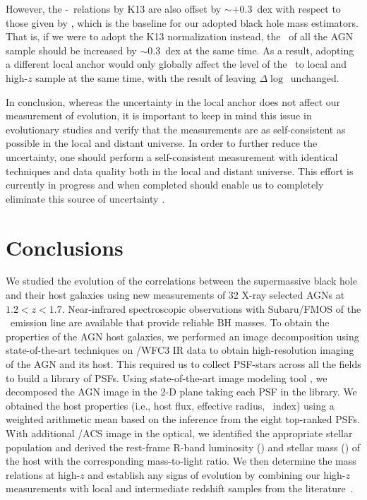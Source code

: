\documentclass[apj]{emulateapj}
\begin{document}
However, the \mbh-\sigstar\ relations by K13 are also offset by  $\sim+0.3$~dex with respect to those given by \citet{Woo2010}, which is the baseline for our adopted black hole mass estimators. That is, if we were to adopt the K13 normalization instead, the \mbh\ of all the AGN sample should be increased by $\sim$0.3~dex at the same time. As a result, adopting a different local anchor would only globally affect the level of the \mbh\ to local and high-$z$ sample at the same time, with the result of leaving $\Delta\log$\mbh\ unchanged.  

In conclusion, whereas the uncertainty in the local anchor does not affect our measurement of evolution, it is important to keep in mind this issue in evolutionary studies and verify that the measurements are as self-consistent as possible in the local and distant universe. In order to further reduce the uncertainty, one should perform a self-consistent measurement with identical techniques and data quality both in the local and distant universe. This effort is currently in progress and when completed should enable us to completely eliminate this source of uncertainty \citep{Bennert11,Harris2012, Bennert2015}.


\section{Conclusions} \label{sec:sum}

We studied the evolution of the correlations between the supermassive black hole and their host galaxies using new measurements of 32 X-ray selected AGNs at $1.2<z<1.7$. Near-infrared spectroscopic observations with Subaru/FMOS of the \halpha\ emission line are available that provide reliable BH masses. To obtain the properties of the AGN host galaxies, we performed an image decomposition using state-of-the-art techniques on \hst/WFC3 IR data to obtain high-resolution imaging of the AGN and its host. This required us to collect PSF-stars across all the fields to build a library of PSFs. Using state-of-the-art image modeling tool \lenstronomy, we decomposed the AGN image in the 2-D plane taking each PSF in the library. We obtained the host properties (i.e., host flux, effective radius, \sersic\ index) using a weighted arithmetic mean based on the inference from the eight top-ranked PSFs. With additional \hst/ACS image in the optical, we identified the appropriate stellar population and derived the rest-frame R-band luminosity (\lhost) and stellar mass (\smass) of the host with the corresponding mass-to-light ratio.
We then determine the mass relations at high-$z$ and establish any signs of evolution by combining our high-$z$ measurements with local and intermediate redshift samples from the literature~\citep{Park15, Bennert11, SS13, Cisternas2011}. 
\end{document}
